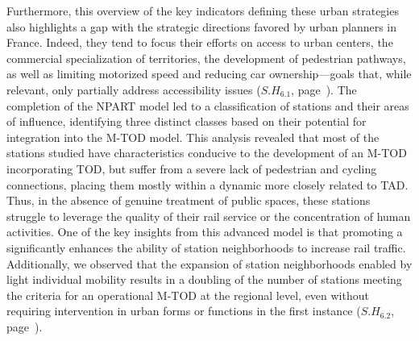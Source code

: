 \begin{refsegment}
Furthermore, this overview of the key indicators defining these urban strategies also highlights a gap with the strategic directions favored by urban planners in France. Indeed, they tend to focus their efforts on access to urban centers, the commercial specialization of territories, the development of pedestrian pathways, as well as limiting motorized speed and reducing car ownership—goals that, while relevant, only partially address accessibility issues (\hyperref[sous-hypothese-6.1]{\(S.H_{6.1}\)}, page~\pageref{sous-hypothese-6.1}). The completion of the \acrshort{NPART} model led to a classification of stations and their areas of influence, identifying three distinct classes based on their potential for integration into the \acrshort{M-TOD} model. This analysis revealed that most of the stations studied have characteristics conducive to the development of an \acrshort{M-TOD} incorporating \acrshort{TOD}, but suffer from a severe lack of pedestrian and cycling connections, placing them mostly within a dynamic more closely related to \acrfull{TAD}. Thus, in the absence of genuine treatment of public spaces, these stations struggle to leverage the quality of their rail service or the concentration of human activities. One of the key insights from this advanced model is that promoting a  significantly enhances the ability of station neighborhoods to increase rail traffic. Additionally, we observed that the expansion of station neighborhoods enabled by light individual mobility results in a doubling of the number of stations meeting the criteria for an operational \acrshort{M-TOD} at the regional level, even without requiring intervention in urban forms or functions in the first instance (\hyperref[sous-hypothese-6.2]{\(S.H_{6.2}\)}, page~\pageref{sous-hypothese-6.2}).%


\end{refsegment}
